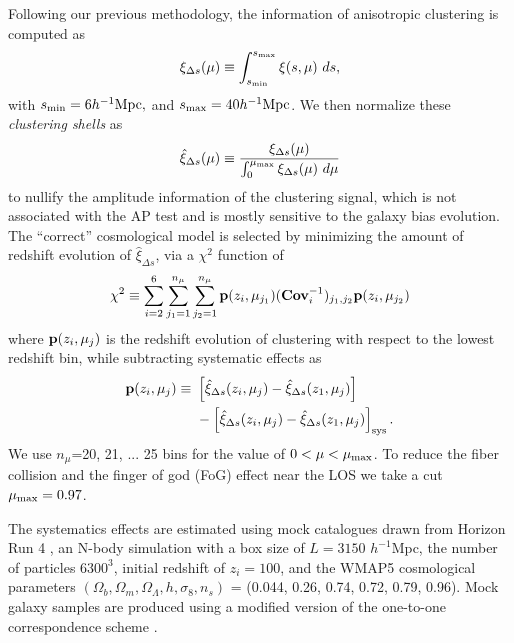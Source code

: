 \documentclass[iop]{emulateapj}
\begin{document}
Following our previous methodology, the information of anisotropic clustering is computed as 
\begin{equation}
\xi_{\Delta s} (\mu) \equiv \int_{s_{\rm min}}^{s_{\rm max}} \xi (s,\mu)\ ds,
\end{equation}
with $s_{\rm min}=6 h^{-1} {\rm Mpc},$ and $s_{\rm max}=40 h^{-1} {\rm Mpc}$.
We then normalize these {\em clustering shells} as 
\begin{equation}
\hat\xi_{\Delta s}(\mu) \equiv \frac{\xi_{\Delta s}(\mu)}{\int_{0}^{\mu_{\rm max}}\xi_{\Delta s}(\mu)\ d\mu}
\end{equation}
to nullify the amplitude information of the clustering signal, 
which is not associated with the AP test and is mostly sensitive to the galaxy bias evolution.
The ``correct'' cosmological model is selected by minimizing the amount of redshift evolution of $\hat\xi_{\Delta s}$,
via a $\chi^2$ function of 
\begin{equation}
 \chi^2\equiv \sum_{i=2}^{6} \sum_{j_1=1}^{n_{\mu}} \sum_{j_2=1}^{n_{\mu}} {\bf p}(z_i,\mu_{j_1}) ({\bf Cov}_{i}^{-1})_{j_1,j_2}  {\bf p}(z_i,\mu_{j_2})
\end{equation}
where ${\bf p}(z_i,\mu_{j})$ is the redshift evolution of clustering with respect to the lowest redshift bin,
while subtracting systematic effects as
\begin{eqnarray}
 {\bf p}(z_i,\mu_{j}) \equiv\ & \left[\hat\xi_{\Delta s}(z_i,\mu_j)-\hat\xi_{\Delta s}(z_1,\mu_j)\right] \\ \nonumber
 &- \left[\hat\xi_{\Delta s}(z_i,\mu_j)-\hat\xi_{\Delta s}(z_1,\mu_j)\right]_{\rm sys}.
\end{eqnarray}
We use $n_{\mu}$=20, 21, ... 25 bins for the value of 
$0<\mu<\mu_{\rm max}$.
To reduce the fiber collision and the finger of god (FoG) effect \citep{FOG} near the LOS we take a cut $\mu_{\rm max} = 0.97$.

The systematics effects are estimated using mock catalogues drawn from Horizon Run 4 \citep[HR4;][]{HR4},
an N-body simulation with a box size of $L={3150}$ $h^{-1}$Mpc, the number of particles $6300^3$,   
initial redshift of $z_{i}=100$, and the WMAP5\citep{komatsu2011} cosmological parameters 
$(\Omega_{b},\Omega_{m},\Omega_\Lambda,h,\sigma_8,n_s)$  = (0.044, 0.26, 0.74, 0.72, 0.79, 0.96). 
Mock galaxy samples are produced using a modified version of the one-to-one correspondence scheme \citep{hong2016}. 
\end{document}
